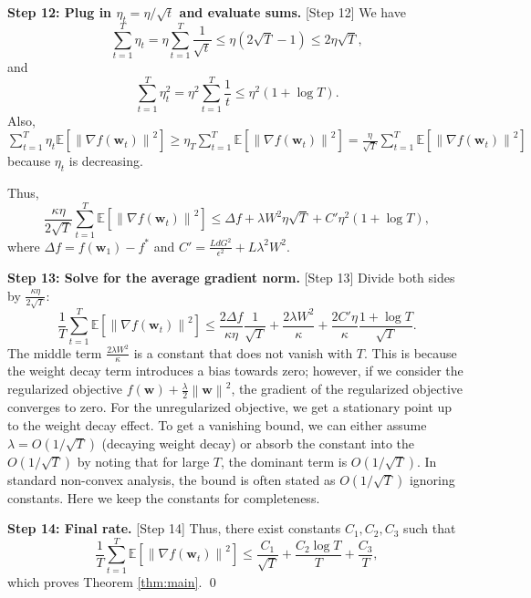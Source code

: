 \documentclass{article}
\theoremstyle{plain}
\theoremstyle{definition}
\renewcommand{\vec}[1]{\boldsymbol{#1}}
\newcommand{\norm}[1]{\left\| #1 \right\|}
\newcommand{\expect}[1]{\mathbb{E}\left[ #1 \right]}
\begin{document}
\textbf{Step 12: Plug in $\eta_t = \eta / \sqrt{t}$ and evaluate sums.} [Step 12]
We have
\begin{equation}
    \sum_{t=1}^T \eta_t = \eta \sum_{t=1}^T \frac{1}{\sqrt{t}} \le \eta (2\sqrt{T} - 1) \le 2 \eta \sqrt{T},
\end{equation}
and
\begin{equation}
    \sum_{t=1}^T \eta_t^2 = \eta^2 \sum_{t=1}^T \frac{1}{t} \le \eta^2 (1 + \log T).
\end{equation}
Also, $\sum_{t=1}^T \eta_t \expect{\norm{\nabla f(\vec{w}_t)}^2} \ge \eta_T \sum_{t=1}^T \expect{\norm{\nabla f(\vec{w}_t)}^2} = \frac{\eta}{\sqrt{T}} \sum_{t=1}^T \expect{\norm{\nabla f(\vec{w}_t)}^2}$ because $\eta_t$ is decreasing.

Thus,
\begin{equation}
    \frac{\kappa \eta}{2\sqrt{T}} \sum_{t=1}^T \expect{\norm{\nabla f(\vec{w}_t)}^2} \le \Delta f + \lambda W^2 \eta \sqrt{T} + C' \eta^2 (1 + \log T),
\end{equation}
where $\Delta f = f(\vec{w}_1) - f^*$ and $C' = \frac{L d G^2}{\epsilon^2} + L \lambda^2 W^2$.

\textbf{Step 13: Solve for the average gradient norm.} [Step 13]
Divide both sides by $\frac{\kappa \eta}{2\sqrt{T}}$:
\begin{equation}
    \frac{1}{T} \sum_{t=1}^T \expect{\norm{\nabla f(\vec{w}_t)}^2} \le \frac{2 \Delta f}{\kappa \eta} \frac{1}{\sqrt{T}} + \frac{2 \lambda W^2}{\kappa} + \frac{2 C' \eta}{\kappa} \frac{1 + \log T}{\sqrt{T}}.
\end{equation}
The middle term $\frac{2 \lambda W^2}{\kappa}$ is a constant that does not vanish with $T$. This is because the weight decay term introduces a bias towards zero; however, if we consider the regularized objective $f(\vec{w}) + \frac{\lambda}{2} \norm{\vec{w}}^2$, the gradient of the regularized objective converges to zero. For the unregularized objective, we get a stationary point up to the weight decay effect. To get a vanishing bound, we can either assume $\lambda = O(1/\sqrt{T})$ (decaying weight decay) or absorb the constant into the $O(1/\sqrt{T})$ by noting that for large $T$, the dominant term is $O(1/\sqrt{T})$. In standard non-convex analysis, the bound is often stated as $O(1/\sqrt{T})$ ignoring constants. Here we keep the constants for completeness.

\textbf{Step 14: Final rate.} [Step 14]
Thus, there exist constants $C_1, C_2, C_3$ such that
\begin{equation}
    \frac{1}{T} \sum_{t=1}^T \expect{\norm{\nabla f(\vec{w}_t)}^2} \le \frac{C_1}{\sqrt{T}} + \frac{C_2 \log T}{T} + \frac{C_3}{T},
\end{equation}
which proves Theorem \ref{thm:main}. \qed
\end{document}

